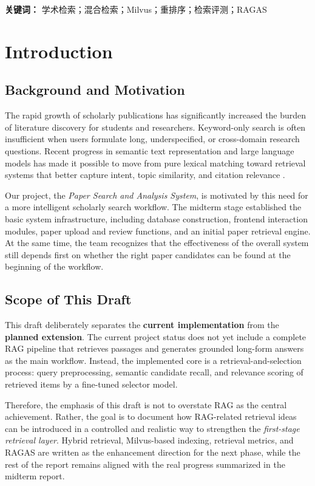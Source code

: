 \documentclass[11pt,a4paper,oneside]{report}
\begin{document}
\noindent\textbf{关键词：} 学术检索；混合检索；Milvus；重排序；检索评测；RAGAS

\tableofcontents

\clearpage
{}

\chapter{Introduction}

\section{Background and Motivation}

The rapid growth of scholarly publications has significantly increased the burden of
literature discovery for students and researchers. Keyword-only search is often
insufficient when users formulate long, underspecified, or cross-domain research
questions. Recent progress in semantic text representation and large language models
has made it possible to move from pure lexical matching toward retrieval systems that
better capture intent, topic similarity, and citation relevance \cite{croft2010,reimers2019}.

Our project, the \textit{Paper Search and Analysis System}, is motivated by this need for a
more intelligent scholarly search workflow. The midterm stage established the basic
system infrastructure, including database construction, frontend interaction modules,
paper upload and review functions, and an initial paper retrieval engine. At the same
time, the team recognizes that the effectiveness of the overall system still depends
first on whether the right paper candidates can be found at the beginning of the
workflow.

\section{Scope of This Draft}

This draft deliberately separates the \textbf{current implementation} from the
\textbf{planned extension}. The current project status does not yet include a complete
RAG pipeline that retrieves passages and generates grounded long-form answers as the
main workflow. Instead, the implemented core is a retrieval-and-selection process:
query preprocessing, semantic candidate recall, and relevance scoring of retrieved
items by a fine-tuned selector model.

Therefore, the emphasis of this draft is not to overstate RAG as the central
achievement. Rather, the goal is to document how RAG-related retrieval ideas can be
introduced in a controlled and realistic way to strengthen the \emph{first-stage
retrieval layer}. Hybrid retrieval, Milvus-based indexing, retrieval metrics, and
RAGAS are written as the enhancement direction for the next phase, while the rest of
the report remains aligned with the real progress summarized in the midterm report.
\end{document}
